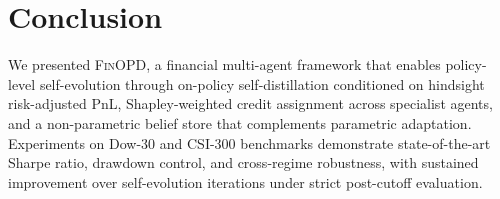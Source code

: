 \section{Conclusion}
\label{sec:conclusion}

We presented \textsc{FinOPD}, a financial multi-agent framework that enables policy-level self-evolution through on-policy self-distillation conditioned on hindsight risk-adjusted PnL, Shapley-weighted credit assignment across specialist agents, and a non-parametric belief store that complements parametric adaptation. Experiments on Dow-30 and CSI-300 benchmarks demonstrate state-of-the-art Sharpe ratio, drawdown control, and cross-regime robustness, with sustained improvement over self-evolution iterations under strict post-cutoff evaluation.
